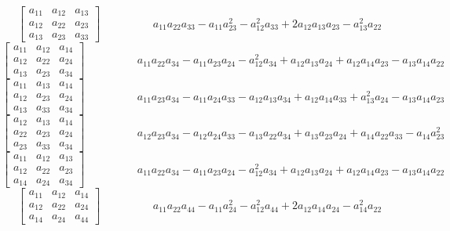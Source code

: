 \documentclass[12pt]{article}
\begin{document}
$$\left[\begin{matrix}a_{11} & a_{12} & a_{13}\\a_{12} & a_{22} & a_{23}\\a_{13} & a_{23} & a_{33}\end{matrix}\right]\hspace{2cm} a_{11} a_{22} a_{33} - a_{11} a_{23}^{2} - a_{12}^{2} a_{33} + 2 a_{12} a_{13} a_{23} - a_{13}^{2} a_{22}$$   
$$\left[\begin{matrix}a_{11} & a_{12} & a_{14}\\a_{12} & a_{22} & a_{24}\\a_{13} & a_{23} & a_{34}\end{matrix}\right]\hspace{2cm} a_{11} a_{22} a_{34} - a_{11} a_{23} a_{24} - a_{12}^{2} a_{34} + a_{12} a_{13} a_{24} + a_{12} a_{14} a_{23} - a_{13} a_{14} a_{22}$$   
$$\left[\begin{matrix}a_{11} & a_{13} & a_{14}\\a_{12} & a_{23} & a_{24}\\a_{13} & a_{33} & a_{34}\end{matrix}\right]\hspace{2cm} a_{11} a_{23} a_{34} - a_{11} a_{24} a_{33} - a_{12} a_{13} a_{34} + a_{12} a_{14} a_{33} + a_{13}^{2} a_{24} - a_{13} a_{14} a_{23}$$   
$$\left[\begin{matrix}a_{12} & a_{13} & a_{14}\\a_{22} & a_{23} & a_{24}\\a_{23} & a_{33} & a_{34}\end{matrix}\right]\hspace{2cm} a_{12} a_{23} a_{34} - a_{12} a_{24} a_{33} - a_{13} a_{22} a_{34} + a_{13} a_{23} a_{24} + a_{14} a_{22} a_{33} - a_{14} a_{23}^{2}$$   
$$\left[\begin{matrix}a_{11} & a_{12} & a_{13}\\a_{12} & a_{22} & a_{23}\\a_{14} & a_{24} & a_{34}\end{matrix}\right]\hspace{2cm} a_{11} a_{22} a_{34} - a_{11} a_{23} a_{24} - a_{12}^{2} a_{34} + a_{12} a_{13} a_{24} + a_{12} a_{14} a_{23} - a_{13} a_{14} a_{22}$$   
$$\left[\begin{matrix}a_{11} & a_{12} & a_{14}\\a_{12} & a_{22} & a_{24}\\a_{14} & a_{24} & a_{44}\end{matrix}\right]\hspace{2cm} a_{11} a_{22} a_{44} - a_{11} a_{24}^{2} - a_{12}^{2} a_{44} + 2 a_{12} a_{14} a_{24} - a_{14}^{2} a_{22}$$   
\end{document}
